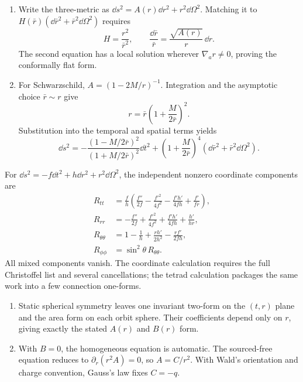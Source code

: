 \ExerciseEditorialNote

\begin{enumerate}[leftmargin=2.8em,itemsep=1.2em]
\begin{enumerate}[label=\alph*),leftmargin=2em]
\item Write the three-metric as
\(\dd s^2=A(r)\dd r^2+r^2\dd\Omega^2\).  Matching it to
\(H(\bar r)(\dd\bar r^2+\bar r^2\dd\Omega^2)\) requires
\[
 H=\frac{r^2}{\bar r^2},
 \qquad
 \frac{\dd\bar r}{\bar r}=\frac{\sqrt{A(r)}}{r}\,\dd r.
\]
The second equation has a local solution wherever \(\nabla_ar\ne0\), proving
the conformally flat form.

\item For Schwarzschild,
\(A=(1-2M/r)^{-1}\).  Integration and the asymptotic choice
\(\bar r\sim r\) give
\[
 r=\bar r\left(1+\frac{M}{2\bar r}\right)^2.
\]
Substitution into the temporal and spatial terms yields
\[
 \dd s^2=-\frac{(1-M/2\bar r)^2}{(1+M/2\bar r)^2}\dd t^2
 +\left(1+\frac{M}{2\bar r}\right)^4
 (\dd\bar r^2+\bar r^2\dd\Omega^2).
\]
\end{enumerate}

For
\(\dd s^2=-f\dd t^2+h\dd r^2+r^2\dd\Omega^2\), the independent nonzero
coordinate components are
\[
\begin{aligned}
R_{tt}&=\frac{f}{h}\left(
 \frac{f''}{2f}-\frac{f'^2}{4f^2}-\frac{f'h'}{4fh}
 +\frac{f'}{fr}\right),\\
R_{rr}&=-\frac{f''}{2f}+\frac{f'^2}{4f^2}
 +\frac{f'h'}{4fh}+\frac{h'}{hr},\\
R_{\theta\theta}&=1-\frac1h+\frac{rh'}{2h^2}
 -\frac{rf'}{2fh},\\
R_{\phi\phi}&=\sin^2\theta\,R_{\theta\theta}.
\end{aligned}
\]
All mixed components vanish.  The coordinate calculation requires the full
Christoffel list and several cancellations; the tetrad calculation packages
the same work into a few connection one-forms.

\begin{enumerate}[label=\alph*),leftmargin=2em]
\item Static spherical symmetry leaves one invariant two-form on the
\((t,r)\) plane and the area form on each orbit sphere.  Their coefficients
depend only on \(r\), giving exactly the stated \(A(r)\) and \(B(r)\) form.

\item With \(B=0\), the homogeneous equation is automatic.  The sourced-free
equation reduces to
\(\partial_r(r^2A)=0\), so \(A=C/r^2\).  With Wald's orientation and charge
convention, Gauss's law fixes \(C=-q\).


\end{enumerate}
\end{enumerate}

